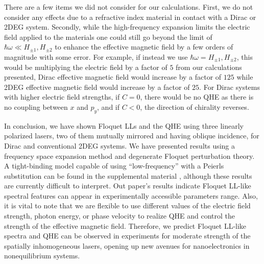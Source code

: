 \documentclass[aps,prb,twocolumn,showpacs,superscriptaddress]{revtex4-2}
\begin{document}
There are a few items we did not consider for our calculations.
First, we do not consider any effects due to a refractive index material in contact with a Dirac or 2DEG system.
Secondly, while the high-frequency expansion limits the electric field applied to the materials one could still go beyond the limit of $\hbar \omega \ll H_{\pm 1}, H_{\pm2}$ to enhance the effective magnetic field by a few orders of magnitude with some error.
For example, if instead we use $\hbar\omega = H_{\pm1}, H_{\pm2}$, this would be multiplying the electric field by a factor of $5$ from our calculations presented, Dirac effective magnetic field would increase by a factor of $125$ while 2DEG effective magnetic field would increase by a factor of $25$.
For Dirac systems with higher electric field strengths, if $C=0$, there would be no QHE as there is no coupling between $x$ and $p_y$, and if $C<0$, the direction of chirality reverses.

In conclusion, we have shown Floquet LLs and the QHE using three linearly polarized lasers, two of them mutually mirrored and having oblique incidence, for Dirac and conventional 2DEG systems.
We have presented results using a frequency space expansion method and degenerate Floquet perturbation theory.
A tight-binding model capable of using ``low-frequency'' with a Peierls substitution can be found in the supplemental material \cite{supp}, although these results are currently difficult to interpret.
Out paper's results indicate Floquet LL-like spectral features can appear in experimentally accessible parameters range.
Also, it is vital to note that we are flexible to use different values of the electric field strength, photon energy, or phase velocity to realize QHE and control the strength of the effective magnetic field.
Therefore, we predict Floquet LL-like spectra and QHE can be observed in experiments for moderate strength of the spatially inhomogeneous lasers, opening up new avenues for nanoelectronics in nonequilibrium systems.


\end{document}
